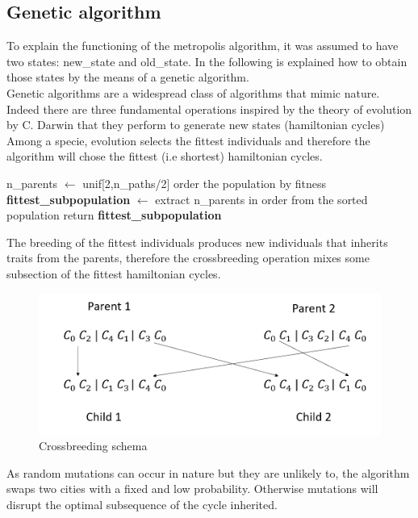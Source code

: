 \documentclass{article}
\begin{document}
\subsection{Genetic algorithm}
To explain the functioning of the metropolis algorithm, it was assumed to have two states: new\_state and old\_state. In the following is explained how to obtain those states by the means of a genetic algorithm.\\
Genetic algorithms are a widespread class of algorithms that mimic nature. Indeed there are three fundamental operations  inspired by the theory of evolution by C. Darwin that they perform to generate new states (hamiltonian cycles) \\
Among a specie, evolution selects the fittest individuals and therefore the algorithm will chose the fittest (i.e shortest) hamiltonian cycles. \\
\begin{algorithm}[H]
    \begin{algorithmic}[1]
        \State n\_parents $\leftarrow$ unif[2,n\_paths/2]
        \State order the population by fitness
        \State \textbf{fittest\_subpopulation} $\leftarrow$ extract n\_parents in order from the sorted population
        \State return \textbf{fittest\_subpopulation}
       \EndFunction
\end{algorithmic}
\end{algorithm}
\noindent The breeding of the fittest individuals produces new individuals that inherits traits from the parents, therefore the crossbreeding operation mixes some subsection of the fittest hamiltonian cycles. \\
\begin{figure}[H]\includegraphics[scale=0.5]{crossbreeding.png} 
\centering
\caption{Crossbreeding schema}
\end{figure}

\noindent As random mutations can occur in nature but they are unlikely to, the algorithm swaps two cities with a fixed and low probability. Otherwise mutations will disrupt the optimal subsequence of the cycle inherited. \\
\end{document}
